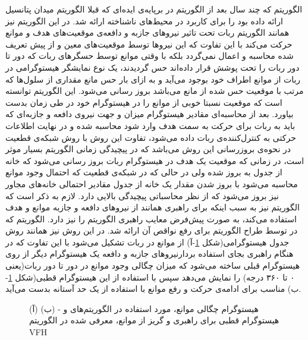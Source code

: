 الگوریتم  که چند سال بعد از الگوریتم  در  برپایه‌ی ایده‌ای که قبلا الگوریتم میدان پتانسیل ارائه داده بود را برای کاربرد در محیط‌های ناشناخته ارائه شد. در این الگوریتم نیز همانند الگوریتم  ربات تحت تاثیر نیروهای جازبه و دافعه‌ی موقعیت‌های هدف و موانع حرکت می‌کند با این تفاوت که این نیروها توسط موقعیت‌های معین و از پیش تعریف شده محاسبه و اعمال نمی‌گردد بلکه با وقتی موانع توسط حسگرهای ربات که دور تا دور ربات را تحت پوشش قرار داده‌اند حس گردیدند، یک نوع نمایشگر هیستوگرامی در ربات از موانع اطراف خود بوجود می‌آید و به ازای بار حس مانع مقداری از سلول‌ها که مرتب با موقعیت حس شده از مانع می‌باشد بروز رسانی می‌شود. این الگوریتم توانسته است که موقعیت نسبتا خوبی از موانع را در هیستوگرام خود در طی زمان بدست بیاورد. بعد از محاسبه‌ای مقادیر هیستوگرام میزان و جهت نیروی دافعه و جازبه‌ای که باید به ربات برای حرکت به سمت هدف وارد شود محاسبه شده و در نهایت اطلاعات حرکتی به کنترل‌کننده‌ی ربات داده می‌شود، تفاوت این روش با روش شبکه‌ی قطعیت در نحوه‌ی بروزرسانی این روش می‌باشد که در پیچیدگی زمانی الگوریتم بسیار موثر است، در  زمانی که موقعیت یک هدف در هیستوگرام ربات بروز رسانی می‌شود که خانه از جدول به بروز شده ولی در حالی که در شبکه‌ی قطعیت که احتمال وجود موانع محاسبه‌ می‌شود با بروز شدن مقدار یک خانه از جدول مقادیر احتمالی خانه‌های مجاور نیز بروز می‌شود که از نظر محاسباتی پیچیدگی بالایی دارد. لازم به ذکر است که الگوریتم  نیز به سبب اینکه برای راهبری همانند  از نیروهای دافعه و جازبه موانع و هدف استفاده می‌کند، به صورت پیش‌فرض معایب راهبری الگوریتم  را نیز دارد.
الگوریتم  که در  توسط طراح الگوریتم  برای رفع نواقص آن ارائه شد. در این روش نیز همانند روش  جدول هیستوگرامی(شکل \ref{fig:vff_vfh_histo}-آ) از موانع در ربات تشکیل می‌شود با این تفاوت که در هنگام راهبری بجای استفاده‌ بردارنیرو‌های جازبه و دافعه یک هیستوگرام دیگر از روی هیستوگرام قبلی ساخته می‌شود که میزان چگالی وجود موانع در دور تا دور ربات(یعنی ۰ تا ۳۶۰ درجه) را نمایش می‌دهد سپس با استفاده از این هیستوگرام قطبی(شکل \ref{fig:vff_vfh_histo}-ب) مناسب برای ادامه‌ی حرکت و رفع موانع با استفاده از یک حد آستانه بدست می‌آید.

\begin{figure}
\centering
{}
\caption{(آ) هیستوگرام‌ چگالی موانع، مورد استفاده در الگوریتم‌های  و  - (ب) هیستوگرام قطبی برای راهبری و گریز از موانع، معرفی شده در الگوریتم VFH}
\label{fig:vff_vfh_histo}
\end{figure}

